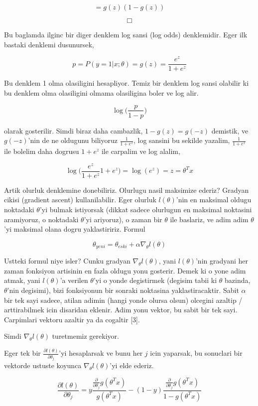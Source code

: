 \documentclass[12pt,fleqn]{article}\usepackage{../common}
\begin{document}
$$
 = g(z)(1-g(z))
 $$

$$ \Box $$

Bu baglamda ilginc bir diger denklem log sansi (log odds) denklemidir. Eger
ilk bastaki denklemi dusunursek,

$$ p = P(y=1|x;\theta) = g(z) = \frac{e^{z}}{1+e^{z}}  $$

Bu denklem 1 olma olasiligini hesapliyor. Temiz bir denklem log sansi
olabilir ki bu denklem olma olasiligini olmama olasiligina boler ve log alir.

$$ \log \bigg( \frac{p}{1-p} \bigg)$$

olarak gosterilir. Simdi biraz daha cambazlik, $1 - g(z) = g(-z)$ demistik,
ve $g(-z)$'nin de ne oldugunu biliyoruz $\frac{1}{1+e^{z}}$, log sansini bu
sekilde yazalim, $\frac{1}{1+e^{z}}$ ile bolelim daha dogrusu $1+e^{z}$ ile
carpalim ve log alalim,

$$ \log \bigg( \frac{e^{z}}{1+e^{z}} 1+e^{z}  \bigg) = \log(e^{z}) = z = \theta^Tx$$

Artik olurluk denklemine donebiliriz. Olurlugu nasil maksimize ederiz?
Gradyan cikisi (gradient ascent) kullanilabilir. Eger olurluk
$l(\theta)$'nin en maksimal oldugu noktadaki $\theta$'yi bulmak
istiyorsak (dikkat sadece olurlugun en maksimal noktasini aramiyoruz,
o noktadaki $\theta$'yi ariyoruz), o zaman bir $\theta$ ile baslariz,
ve adim adim $\theta$'yi maksimal olana dogru yaklastiririz. Formul

$$ \theta_{yeni} = \theta_{eski} + \alpha \nabla_\theta l(\theta)$$

Ustteki formul niye isler? Cunku gradyan $\nabla_\theta l(\theta)$,
yani $l(\theta)$'nin gradyani her zaman fonksiyon artisinin en fazla
oldugu yonu gosterir. Demek ki o yone adim atmak, yani $l(\theta)$'a
verilen $\theta$'yi o yonde degistirmek (degisim tabii ki $\theta$
bazinda, $\theta$'nin degisimi), bizi fonksiyonun bir sonraki
noktasina yaklastiracaktir. Sabit $\alpha$ bir tek sayi sadece, atilan
adimin (hangi yonde olursa olsun) olcegini azaltip / arttirabilmek
icin disaridan eklenir. Adim yonu vektor, bu sabit bir tek
sayi. Carpimlari vektoru azaltir ya da cogaltir [3].

Simdi $\nabla_\theta l(\theta)$ turetmemiz gerekiyor.

Eger tek bir $\frac{\partial l(\theta)}{\partial \theta_j}$'yi
hesaplarsak ve bunu her $j$ icin yaparsak, bu sonuclari bir vektorde
ustuste koyunca $\nabla_\theta l(\theta)$'yi elde ederiz.


$$ 
\frac{\partial l(\theta)}{\partial \theta_j} =
y 
\frac{\frac{\partial }{\partial \theta_j}g(\theta^Tx) }{g(\theta^Tx)} 
-
(1-y) 
\frac{\frac{\partial }{\partial \theta_j}g(\theta^Tx) }{1-g(\theta^Tx)} 
$$
\end{document}
